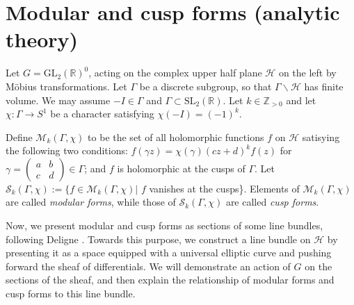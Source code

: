 \section{Modular and cusp forms (analytic theory)}
\label{section-modular-forms-analytic}
	Let $G = \text{GL}_{2}(\mathbb{R})^0$, acting on the complex upper half plane $\mathcal H$ on the left by M\"obius transformations. Let $\Gamma$ be a discrete subgroup, so  that $\Gamma\backslash\mathcal{H}$ has finite volume. We may assume $-I \in \Gamma$ and $\Gamma\subset \text{SL}_{2}(\mathbb{R})$.  Let $k \in \mathbb{Z}_{>0}$ and let $\chi: \Gamma \to S^{1}$ be a character satisfying $\chi(-I) = (-1)^{k}$. 
\begin{definition}
	\label{modular-forms}
	Define $\mathcal{M}_{k}(\Gamma, \chi)$ to be the set of all holomorphic functions $f$ on $\mathcal{H}$ satisying the following two conditions: $f(\gamma z) = \chi(\gamma) (cz + d)^{k}f(z)$ for $\gamma = \begin{pmatrix}  a & b \\ c& d \end{pmatrix} \in \Gamma$; and $f$ is holomorphic at the cusps of $\Gamma$. Let $\mathcal{S}_{k}(\Gamma, \chi) := \{ f \in \mathcal{M}_{k}(\Gamma, \chi) |$ $f$ vanishes at the cusps\}.
	Elements of $\mathcal{M}_{k}(\Gamma, \chi)$ are called \textit{modular forms}, while those of $\mathcal{S}_{k}(\Gamma, \chi)$ are called \textit{cusp forms}.
\end{definition}



Now, we present modular and cusp forms as sections of some line bundles, following Deligne \cite{Deligne-formes-modulaires}. Towards this purpose, we construct a line bundle on $\mathcal{H}$ by presenting it as a space equipped with a universal elliptic curve and pushing forward the sheaf of differentials. We will demonstrate an action of $G$ on the sections of the sheaf, and then explain the relationship of modular forms and cusp forms to this line bundle. 



